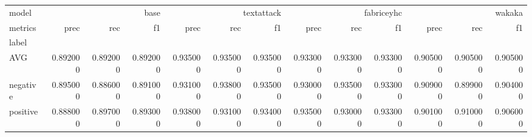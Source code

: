 \begin{tabular}{lrrrrrrrrrrrr}
model & \multicolumn{3}{r}{base} & \multicolumn{3}{r}{textattack} & \multicolumn{3}{r}{fabriceyhc} & \multicolumn{3}{r}{wakaka} \\
metrics & prec & rec & f1 & prec & rec & f1 & prec & rec & f1 & prec & rec & f1 \\
label &  &  &  &  &  &  &  &  &  &  &  &  \\
AVG & 0.892000 & 0.892000 & 0.892000 & 0.935000 & 0.935000 & 0.935000 & 0.933000 & 0.933000 & 0.933000 & 0.905000 & 0.905000 & 0.905000 \\
negative & 0.895000 & 0.886000 & 0.891000 & 0.931000 & 0.938000 & 0.935000 & 0.930000 & 0.935000 & 0.933000 & 0.909000 & 0.899000 & 0.904000 \\
positive & 0.888000 & 0.897000 & 0.893000 & 0.938000 & 0.931000 & 0.934000 & 0.935000 & 0.930000 & 0.933000 & 0.901000 & 0.910000 & 0.906000 \\
\end{tabular}
